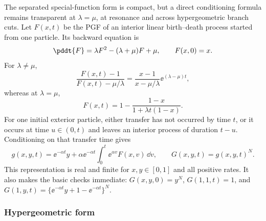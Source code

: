 The separated special-function form is compact, but a direct conditioning formula
remains transparent at \(\lambda=\mu\), at resonance and across hypergeometric
branch cuts.  Let \(F(x,t)\) be the PGF of an interior linear birth--death process
started from one particle.  Its backward equation is
\begin{equation}
 \pddt{F}=\lambda F^2-(\lambda+\mu)F+\mu,
 \qquad F(x,0)=x.
 \label{m:eq:interior-bd-backward}
\end{equation}
For \(\lambda\ne\mu\),
\begin{equation}
 \frac{F(x,t)-1}{F(x,t)-\mu/\lambda}
 =\frac{x-1}{x-\mu/\lambda}\ee^{(\lambda-\mu)t},
 \label{m:eq:interior-bd-ratio}
\end{equation}
whereas at \(\lambda=\mu\),
\begin{equation}
 F(x,t)=1-\frac{1-x}{1+\lambda t(1-x)}.
 \label{m:eq:interior-bd-critical}
\end{equation}
For one initial exterior particle, either transfer has not occurred by time \(t\),
or it occurs at time \(u\in(0,t)\) and leaves an interior process of duration
\(t-u\).  Conditioning on that transfer time gives
\begin{equation}
 g(x,y,t)=\ee^{-\alpha t}y
 +\alpha\ee^{-\alpha t}\int_0^t\ee^{\alpha v}F(x,v)\,\dd v,
 \qquad G(x,y,t)=g(x,y,t)^N.
 \label{m:eq:abd-convolution}
\end{equation}
This representation is real and finite for \(x,y\in[0,1]\) and all positive
rates.  It also makes the basic checks immediate: \(G(x,y,0)=y^N\),
\(G(1,1,t)=1\), and
\(G(1,y,t)=\{\ee^{-\alpha t}y+1-\ee^{-\alpha t}\}^N\).

\subsubsection*{Hypergeometric form}

